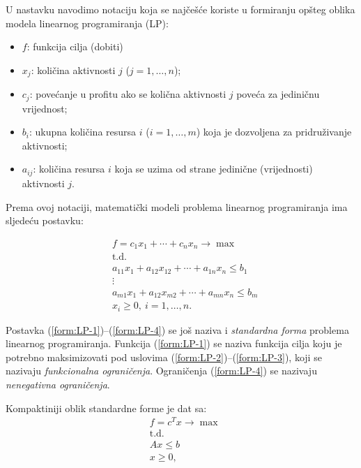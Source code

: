 \documentclass[a4paper, utf8, 11pt, colorlinks]{book}
\theoremstyle{definition}
\begin{document}
U nastavku navodimo notaciju koja se najčešće koriste u formiranju opšteg oblika modela linearnog programiranja (LP):

\begin{itemize}
    \item $f$: funkcija cilja (dobiti) 
    \item $x_j$: količina aktivnosti $j$ ($j = 1,\ldots,n$);
    \item $c_j$: povećanje u profitu ako se količna aktivnosti $j$ poveća za jediničnu vrijednost;
    \item $b_i$: ukupna količina resursa $i$ ($i=1,\ldots,m$) koja je dozvoljena za pridruživanje aktivnosti;
    \item $a_{ij}$: količina resursa $i$ koja se uzima od strane jedinične (vrijednosti) aktivnosti $j$.
\end{itemize}
Prema ovoj notaciji, matematički modeli problema linearnog programiranja ima sljedeću postavku:

\begin{align} 
      &f = c_1 x_1 + \cdots + c_n x_n \rightarrow \max \label{form:LP-1}\\
      & \mbox{t.d.} \nonumber \\
      & a_{11}x_1 + a_{12} x_{12} + \cdots + a_{1n}x_n \leq b_1 \label{form:LP-2} \\
      &\vdots \nonumber \\
      & a_{m1}x_1 + a_{12} x_{m2} + \cdots + a_{mn}x_n \leq b_m \label{form:LP-3} \\
      & x_i \geq 0,\ i=1,\ldots,n.\label{form:LP-4}
\end{align}

Postavka (\ref{form:LP-1})--(\ref{form:LP-4}) se još naziva i \emph{standardna forma} problema linearnog programiranja. Funkcija (\ref{form:LP-1}) se naziva funkcija cilja koju je potrebno maksimizovati pod uslovima (\ref{form:LP-2})--(\ref{form:LP-3}), koji se nazivaju \emph{funkcionalna ograničenja}. Ograničenja (\ref{form:LP-4}) se nazivaju \emph{nenegativna ograničenja}. 

Kompaktiniji oblik standardne forme je dat sa:
\begin{align}
    & f = c^T x \rightarrow \max \label{eq:LP-o1}\\
    & \mbox{t.d.} \nonumber \\
    &  A x \leq b \label{eq:LP-c1} \\
    & x \geq 0 \label{eq:LP-c2},
\end{align}
\end{document}
